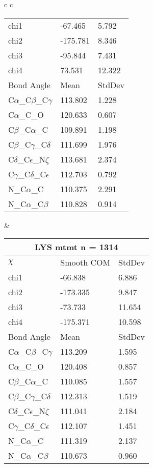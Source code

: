 \begin{longtable}{ c c }
\begin{tabular}{ l l l }
  chi1 & -67.465 & 5.792 \\ 
  chi2 & -175.781 & 8.346 \\ 
  chi3 & -95.844 & 7.431 \\ 
  chi4 & 73.531 & 12.322 \\ \midrule
  Bond Angle   & Mean     & StdDev \\ \midrule
  C$\alpha$\_C$\beta$\_C$\gamma$ & 113.802 & 1.228\\
  C$\alpha$\_C\_O & 120.633 & 0.607\\
  C$\beta$\_C$\alpha$\_C & 109.891 & 1.198\\
  C$\beta$\_C$\gamma$\_C$\delta$ & 111.699 & 1.976\\
  C$\delta$\_C$\epsilon$\_N$\zeta$ & 113.681 & 2.374\\
  C$\gamma$\_C$\delta$\_C$\epsilon$ & 112.703 & 0.792\\
  N\_C$\alpha$\_C & 110.375 & 2.291\\
  N\_C$\alpha$\_C$\beta$ & 110.828 & 0.914\\
  \bottomrule
  \end{tabular}
  &
  \begin{tabular}{ l l l }
  \toprule
  \multicolumn{3}{c}{LYS \textbf{mtmt} n = 1314} \\ \toprule
  $\chi$       & Smooth COM & StdDev \\ \midrule
  chi1 & -66.838 & 6.886 \\ 
  chi2 & -173.335 & 9.847 \\ 
  chi3 & -73.733 & 11.654 \\ 
  chi4 & -175.371 & 10.598 \\ \midrule
  Bond Angle   & Mean     & StdDev \\ \midrule
  C$\alpha$\_C$\beta$\_C$\gamma$ & 113.209 & 1.595\\
  C$\alpha$\_C\_O & 120.408 & 0.857\\
  C$\beta$\_C$\alpha$\_C & 110.085 & 1.557\\
  C$\beta$\_C$\gamma$\_C$\delta$ & 112.313 & 1.519\\
  C$\delta$\_C$\epsilon$\_N$\zeta$ & 111.041 & 2.184\\
  C$\gamma$\_C$\delta$\_C$\epsilon$ & 112.107 & 1.451\\
  N\_C$\alpha$\_C & 111.319 & 2.137\\
  N\_C$\alpha$\_C$\beta$ & 110.673 & 0.960\\
  \bottomrule
  \end{tabular}
  \\

\end{longtable}
